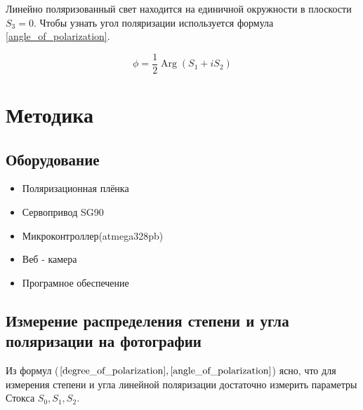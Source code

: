 \documentclass[a4paper]{article}
\begin{document}
Линейно поляризованный свет находится на единичной окружности в плоскости $S_{3} = 0$. Чтобы узнать угол поляризации используется формула \ref{angle_of_polarization}.

\begin{equation}
    \boxed{
        \phi = \frac{1}{2}\operatorname{Arg}(S_{1} + i S_{2})
    }
    \label{angle_of_polarization}
\end{equation}



\section*{\textcolor{header}{Методика}}

\subsection*{\textcolor{sub_header}{Оборудование}}
\begin{itemize}
    \item{Поляризационная плёнка}
    \item{Сервопривод SG90}
    \item{Микроконтроллер(atmega328pb)}
    \item{Веб - камера}
    \item{Програмное обеспечение}
\end{itemize}

\subsection*{\textcolor{sub_header}{Измерение распределения степени и угла поляризации на фотографии}}

Из формул ($\ref{degree_of_polarization},\ref{angle_of_polarization}$) ясно, что для измерения степени и угла линейной поляризации достаточно измерить параметры Стокса $S_{0}, S_{1}, S_{2}$. 
\end{document}
